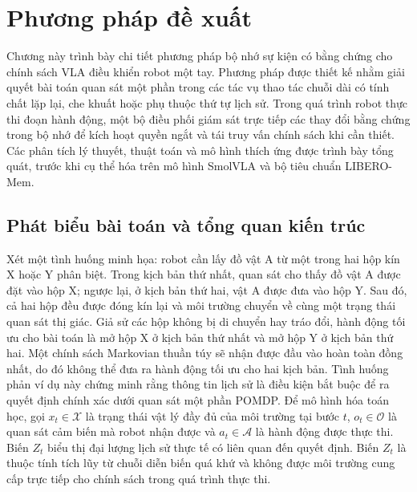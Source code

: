 \chapter{Phương pháp đề xuất}

Chương này trình bày chi tiết phương pháp bộ nhớ sự kiện có bằng chứng cho chính sách VLA điều khiển robot một tay. Phương pháp được thiết kế nhằm giải quyết bài toán quan sát một phần trong các tác vụ thao tác chuỗi dài có tính chất lặp lại, che khuất hoặc phụ thuộc thứ tự lịch sử. Trong quá trình robot thực thi đoạn hành động, một bộ điều phối giám sát trực tiếp các thay đổi bằng chứng trong bộ nhớ để kích hoạt quyền ngắt và tái truy vấn chính sách khi cần thiết. Các phân tích lý thuyết, thuật toán và mô hình thích ứng được trình bày tổng quát, trước khi cụ thể hóa trên mô hình SmolVLA và bộ tiêu chuẩn LIBERO-Mem.

\section{Phát biểu bài toán và tổng quan kiến trúc}

Xét một tình huống minh họa: robot cần lấy đồ vật A từ một trong hai hộp kín X hoặc Y phân biệt. Trong kịch bản thứ nhất, quan sát cho thấy đồ vật A được đặt vào hộp X; ngược lại, ở kịch bản thứ hai, vật A được đưa vào hộp Y. Sau đó, cả hai hộp đều được đóng kín lại và môi trường chuyển về cùng một trạng thái quan sát thị giác. Giả sử các hộp không bị di chuyển hay tráo đổi, hành động tối ưu cho bài toán là mở hộp X ở kịch bản thứ nhất và mở hộp Y ở kịch bản thứ hai. Một chính sách Markovian thuần túy sẽ nhận được đầu vào hoàn toàn đồng nhất, do đó không thể đưa ra hành động tối ưu cho hai kịch bản. Tình huống phản ví dụ này chứng minh rằng thông tin lịch sử là điều kiện bắt buộc để ra quyết định chính xác dưới quan sát một phần POMDP. Để mô hình hóa toán học, gọi $x_t \in \mathcal X$ là trạng thái vật lý đầy đủ của môi trường tại bước $t$, $o_t \in \mathcal O$ là quan sát cảm biến mà robot nhận được và $a_t \in \mathcal A$ là hành động được thực thi. Biến $Z_t$ biểu thị đại lượng lịch sử thực tế có liên quan đến quyết định. Biến $Z_t$ là thuộc tính tích lũy từ chuỗi diễn biến quá khứ và không được môi trường cung cấp trực tiếp cho chính sách trong quá trình thực thi.

